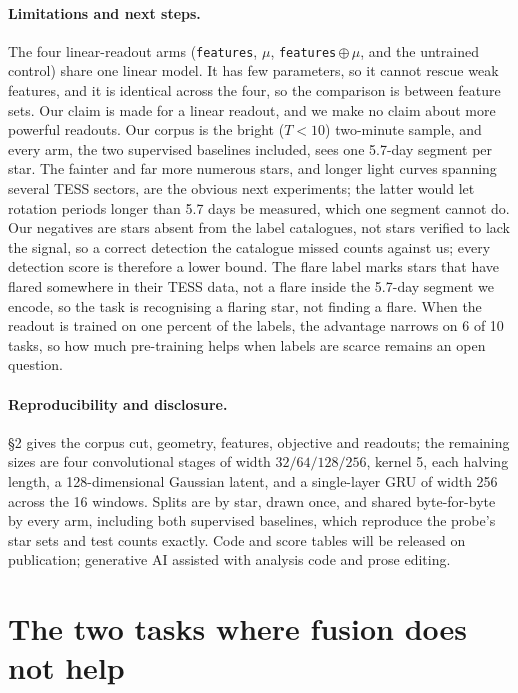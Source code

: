 \documentclass{article}
\begin{document}
\paragraph{\textbf{Limitations and next steps.}} The four linear-readout arms (\texttt{features},
$\mu$, \texttt{features}\,$\oplus\,\mu$, and the untrained control) share one linear model. It has few
parameters, so it cannot rescue weak features, and it is identical across the four, so the comparison
is between feature sets. Our claim is made for a linear readout, and we make no claim about more
powerful readouts. Our corpus is the bright ($T < 10$) two-minute sample, and every arm, the two
supervised baselines included, sees one 5.7-day segment per star. The fainter and far more numerous
stars, and longer light curves spanning several TESS sectors, are the obvious next experiments; the
latter would let rotation periods longer than 5.7 days be measured, which one segment cannot do. Our
negatives are stars absent from the label catalogues, not stars verified to lack the signal, so a
correct detection the catalogue missed counts against us; every detection score is therefore a lower
bound. The flare label marks stars that have flared somewhere in their TESS data, not a flare inside
the 5.7-day segment we encode, so the task is recognising a flaring star, not finding a flare. When
the readout is trained on one percent of the labels, the advantage narrows on 6 of 10 tasks, so how
much pre-training helps when labels are scarce remains an open question.

\paragraph{Reproducibility and disclosure.} \S2 gives the corpus cut, geometry, features, objective
and readouts; the remaining sizes are four convolutional stages of width $32/64/128/256$, kernel 5,
each halving length, a 128-dimensional Gaussian latent, and a single-layer GRU of width 256 across the
16 windows. Splits are by star, drawn once, and shared byte-for-byte by every arm, including both
supervised baselines, which reproduce the probe's star sets and test counts exactly. Code and score tables
will be released on publication; generative AI assisted with analysis code and prose editing.




\appendix

\section{The two tasks where fusion does not help}
\label{app:negatives}
\end{document}
